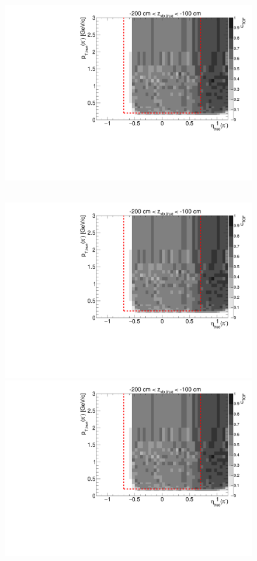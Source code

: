 \begin{figure}[hb]
{  \includegraphics[width=\linewidth,page=17]{graphics/eff/Eff2D_TOF_pion_Minus.pdf}
}~
\parbox{0.495\textwidth}{
  \centering
  \includegraphics[width=\linewidth,page=12]{graphics/eff/Eff2D_TOF_pion_Minus.pdf}\\
  \includegraphics[width=\linewidth,page=14]{graphics/eff/Eff2D_TOF_pion_Minus.pdf}\\
}
\end{figure}
